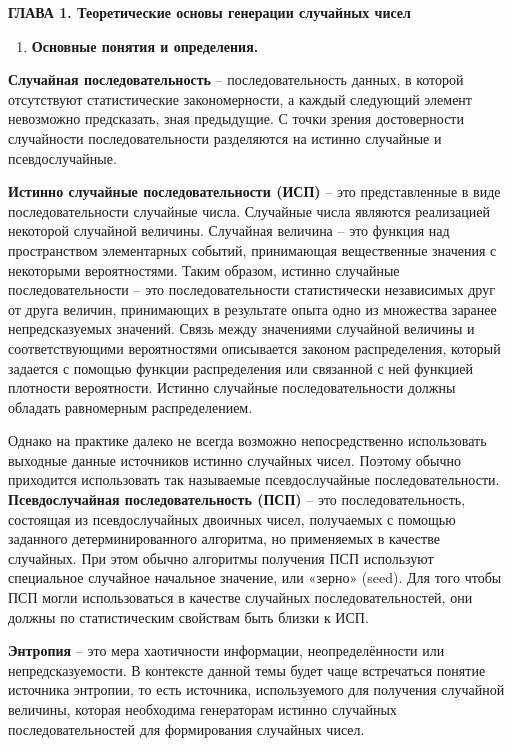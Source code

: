 \clearpage
\textbf{ГЛАВА 1. Теоретические основы генерации случайных чисел}

\begin{enumerate}
\def\labelenumi{\arabic{enumi}.}
\item
  \textbf{Основные понятия и определения.}
\end{enumerate}

\textbf{Случайная последовательность} -- последовательность данных, в
которой отсутствуют статистические закономерности, а каждый следующий
элемент невозможно предсказать, зная предыдущие. С точки зрения
достоверности случайности последовательности разделяются на истинно
случайные и псевдослучайные.

\textbf{Истинно случайные последовательности (ИСП)} -- это
представленные в виде последовательности случайные числа. Случайные
числа являются реализацией некоторой случайной величины. Случайная
величина -- это функция над пространством элементарных событий,
принимающая вещественные значения с некоторыми вероятностями. Таким
образом, истинно случайные последовательности -- это последовательности
статистически независимых друг от друга величин, принимающих в
результате опыта одно из множества заранее непредсказуемых значений.
Связь между значениями случайной величины и соответствующими
вероятностями описывается законом распределения, который задается с
помощью функции распределения или связанной с ней функцией плотности
вероятности. Истинно случайные последовательности должны обладать
равномерным распределением.

Однако на практике далеко не всегда возможно непосредственно
использовать выходные данные источников истинно случайных чисел. Поэтому
обычно приходится использовать так называемые псевдослучайные
последовательности. \textbf{Псевдослучайная последовательность (ПСП)} --
это последовательность, состоящая из псевдослучайных двоичных чисел,
получаемых с помощью заданного детерминированного алгоритма, но
применяемых в качестве случайных. При этом обычно алгоритмы получения
ПСП используют специальное случайное начальное значение, или «зерно»
(seed). Для того чтобы ПСП могли использоваться в качестве случайных
последовательностей, они должны по статистическим свойствам быть близки
к ИСП.

\textbf{Энтропия} -- это мера хаотичности информации, неопределённости
или непредсказуемости. В контексте данной темы будет чаще встречаться
понятие источника энтропии, то есть источника, используемого для
получения случайной величины, которая необходима генераторам истинно
случайных последовательностей для формирования случайных чисел.

